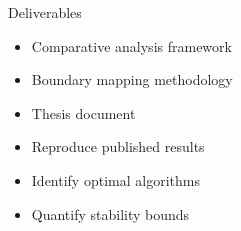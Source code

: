 \begin{frame}{Deliverables}
\begin{tcolorbox}[
    enhanced,
    colback=black!85,
    colframe=AntiqueWhite,
    arc=3mm,
    boxrule=1pt,
    title={\color{mypurple}Expected Deliverables}
    ]
    \begin{itemize}
        \item Comparative analysis framework
        \item Boundary mapping methodology
        \item Thesis document
    \end{itemize}
\end{tcolorbox}

\begin{tcolorbox}[
    enhanced,
    colback=black!85,
    colframe=Red!80!white,
    arc=3mm,
    boxrule=1pt,
    title={\color{Yellow!80!white}Success Criteria}
    ]
    \begin{itemize}
        \item Reproduce published results
        \item Identify optimal algorithms
        \item Quantify stability bounds
    \end{itemize}
\end{tcolorbox}
\end{frame}
